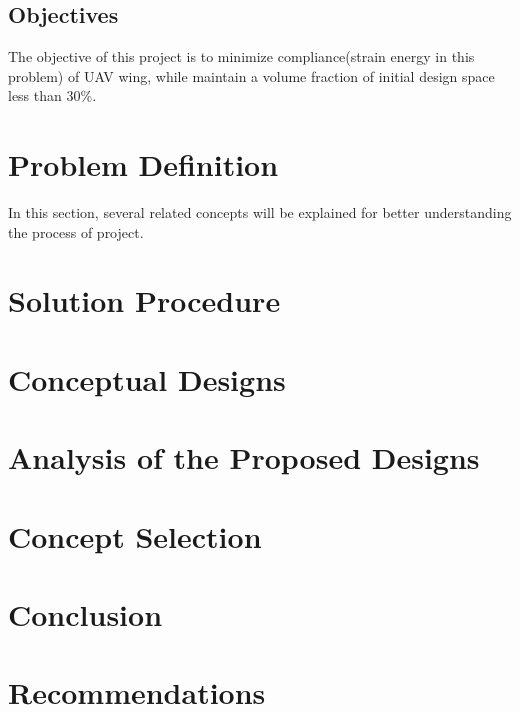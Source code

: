 \section{Objectives}

The objective of this project is to minimize compliance(strain energy in this problem) of UAV wing, while maintain a volume fraction of initial design space less than 30\%.


\chapter{Problem Definition}

In this section, several related concepts will be explained for better understanding the process of project.



\chapter{Solution Procedure}

\chapter{Conceptual Designs}

\chapter{Analysis of the Proposed Designs}
\chapter{Concept Selection}

\chapter{Conclusion}

\chapter{Recommendations}

